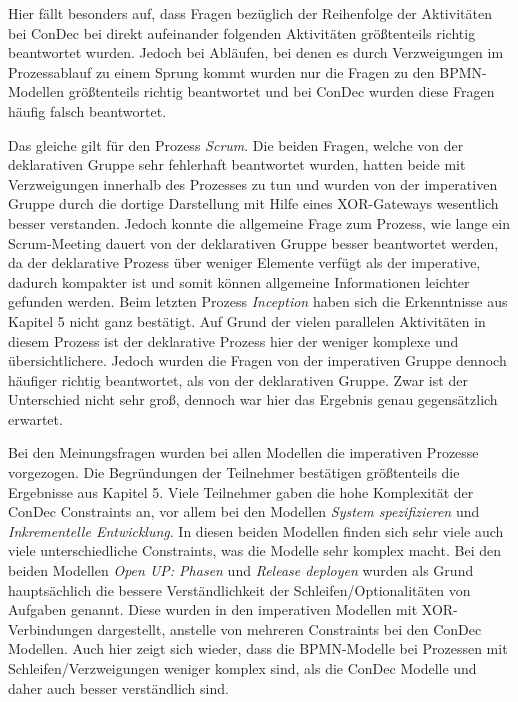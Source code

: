 Hier fällt besonders auf, dass Fragen bezüglich der Reihenfolge der Aktivitäten bei ConDec bei direkt aufeinander folgenden Aktivitäten größtenteils richtig beantwortet wurden. Jedoch bei Abläufen, bei denen es durch Verzweigungen im Prozessablauf zu einem Sprung kommt wurden nur die Fragen zu den BPMN-Modellen größtenteils richtig beantwortet und bei ConDec wurden diese Fragen häufig falsch beantwortet.\newline

Das gleiche gilt für den Prozess \textit{Scrum}. Die beiden Fragen, welche von der deklarativen Gruppe sehr fehlerhaft beantwortet wurden, hatten beide mit Verzweigungen innerhalb des Prozesses zu tun und wurden von der imperativen Gruppe durch die dortige Darstellung mit Hilfe eines XOR-Gateways wesentlich besser verstanden. Jedoch konnte die allgemeine Frage zum Prozess, wie lange ein Scrum-Meeting dauert von der deklarativen Gruppe besser beantwortet werden, da der deklarative Prozess über weniger Elemente verfügt als der imperative, dadurch kompakter ist und somit können allgemeine Informationen leichter gefunden werden. \newline
Beim letzten Prozess \textit{Inception} haben sich die Erkenntnisse aus Kapitel 5 nicht ganz bestätigt. Auf Grund der vielen parallelen Aktivitäten in diesem Prozess ist der deklarative Prozess hier der weniger komplexe und übersichtlichere. Jedoch wurden die Fragen von der imperativen Gruppe dennoch häufiger richtig beantwortet, als von der deklarativen Gruppe. Zwar ist der Unterschied nicht sehr groß, dennoch war hier das Ergebnis genau gegensätzlich erwartet.\newline

Bei den Meinungsfragen wurden bei allen Modellen die imperativen Prozesse vorgezogen. Die Begründungen der Teilnehmer bestätigen größtenteils die Ergebnisse aus Kapitel 5. Viele Teilnehmer gaben die hohe Komplexität der ConDec Constraints an, vor allem bei den Modellen \textit{System spezifizieren} und \textit{Inkrementelle Entwicklung}. In diesen beiden Modellen finden sich sehr viele auch viele unterschiedliche Constraints, was die Modelle sehr komplex macht.\newline
Bei den beiden Modellen \textit{Open UP: Phasen} und \textit{Release deployen} wurden als Grund hauptsächlich die bessere Verständlichkeit der Schleifen/Optionalitäten von Aufgaben genannt. Diese wurden in den imperativen Modellen mit XOR-Verbindungen dargestellt, anstelle von mehreren Constraints bei den ConDec Modellen. Auch hier zeigt sich wieder, dass die BPMN-Modelle bei Prozessen mit Schleifen/Verzweigungen weniger komplex sind, als die ConDec Modelle und daher auch besser verständlich sind.\newline


